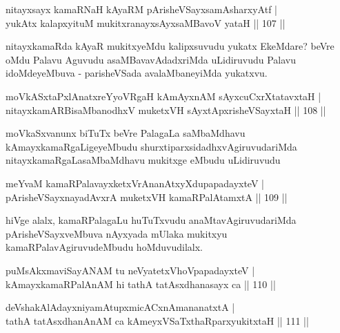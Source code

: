 
\begin{shl}
nitayxsayx kamaRNaH kAyaRM pArisheVSayxsamAsharxyAtf |\\
yukAtx kalapxyituM mukitxranayxsAyxsaMBavoV yataH \hfill || 107 ||
\end{shl}

\begin{artha}
nitayxkamaRda kAyaR mukitxyeMdu kalipxsuvudu yukatx EkeMdare? beVre oMdu Palavu Aguvudu asaMBavavAdadxriMda uLidiruvudu Palavu idoMdeyeMbuva - parisheVSada avalaMbaneyiMda yukatxvu.
\end{artha}

\begin{shl}
moVkASxtaPxlAnatxreYyoVRgaH kAmAyxnAM sAyxcuCxrXtatavxtaH |\\
nitayxkamARBisaMbanodhxV muketxVH sAyxtApxrisheVSayxtaH \hfill || 108 ||
\end{shl}

\begin{artha}
moVkaSxvanunx biTuTx beVre PalagaLa saMbaMdhavu kAmayxkamaRgaLigeyeMbudu shurxtiparxsidadhxvAgiruvudariMda nitayxkamaRgaLasaMbaMdhavu mukitxge eMbudu  uLidiruvudu
\end{artha}


\begin{shl}
meYvaM kamaRPalavayxketxVrAnanAtxyXdupapadayxteV |\\
pArisheVSayxnayadAvxrA muketxVH kamaRPalAtamxtA \hfill || 109 ||
\end{shl}

\begin{artha}
hiVge alalx, kamaRPalagaLu huTuTxvudu anaMtavAgiruvudariMda pArisheVSayxveMbuva nAyxyada mUlaka mukitxyu kamaRPalavAgiruvudeMbudu  hoMduvudilalx.
\end{artha}


\begin{shl}
puMsAkxmaviSayANAM tu neVyatetxVhoVpapadayxteV |\\
kAmayxkamaRPalAnAM hi tathA tatAsxdhanasayx ca \hfill || 110 ||
\end{shl}

\begin{shl}
deVshakAlAdayxniyamAtupxmicACxnAmananatxtA |\\
tathA tatAsxdhanAnAM ca kAmeyxVSaTxthaRparxyukitxtaH \hfill || 111 ||
\end{shl}

